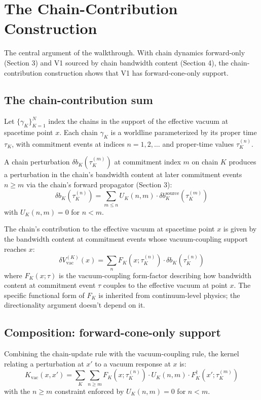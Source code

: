 \documentclass[11pt,a4paper]{article}
\begin{document}
\section{The Chain-Contribution Construction}

The central argument of the walkthrough. With chain dynamics forward-only (Section 3) and V1 sourced by chain bandwidth content (Section 4), the chain-contribution construction shows that V1 has forward-cone-only support.

\subsection{The chain-contribution sum}

Let $\{\gamma_K\}_{K=1}^N$ index the chains in the support of the effective vacuum at spacetime point $x$. Each chain $\gamma_K$ is a worldline parameterized by its proper time $\tau_K$, with commitment events at indices $n = 1, 2, \ldots$ and proper-time values $\tau_K^{(n)}$.

A chain perturbation $\delta b_K(\tau_K^{(m)})$ at commitment index $m$ on chain $K$ produces a perturbation in the chain's bandwidth content at later commitment events $n \geq m$ via the chain's forward propagator (Section 3):
\[
\delta b_K(\tau_K^{(n)}) = \sum_{m \leq n} U_K(n, m) \cdot \delta b_K^{\mathrm{source}}(\tau_K^{(m)})
\]
with $U_K(n, m) = 0$ for $n < m$.

The chain's contribution to the effective vacuum at spacetime point $x$ is given by the bandwidth content at commitment events whose vacuum-coupling support reaches $x$:
\[
\delta V_{\mathrm{vac}}^{(K)}(x) = \sum_n F_K(x; \tau_K^{(n)}) \cdot \delta b_K(\tau_K^{(n)})
\]
where $F_K(x; \tau)$ is the vacuum-coupling form-factor describing how bandwidth content at commitment event $\tau$ couples to the effective vacuum at point $x$. The specific functional form of $F_K$ is inherited from continuum-level physics; the directionality argument doesn't depend on it.

\subsection{Composition: forward-cone-only support}

Combining the chain-update rule with the vacuum-coupling rule, the kernel relating a perturbation at $x'$ to a vacuum response at $x$ is:
\[
K_{\mathrm{vac}}(x, x') = \sum_K \sum_{n \geq m} F_K(x; \tau_K^{(n)}) \cdot U_K(n, m) \cdot F_K^\dagger(x'; \tau_K^{(m)})
\]
with the $n \geq m$ constraint enforced by $U_K(n, m) = 0$ for $n < m$.
\end{document}
